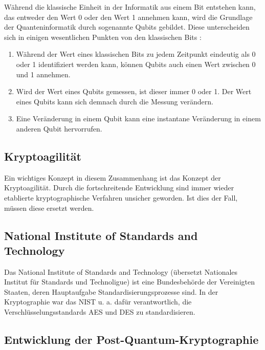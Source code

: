 		Während die klassische Einheit in der Informatik aus einem Bit entstehen kann, das entweder den Wert 0 oder den Wert 1 annehmen kann, wird die Grundlage der Quanteninformatik durch sogenannte Qubits gebildet. Diese unterscheiden sich in einigen wesentlichen Punkten von den klassischen Bits \cite{Just2020}:
		
		\begin{enumerate}
			\item Während der Wert eines klassischen Bits zu jedem Zeitpunkt eindeutig als 0 oder 1 identifiziert werden kann, können Qubits auch einen Wert zwischen 0 und 1 annehmen.
			\item Wird der Wert eines Qubits gemessen, ist dieser immer 0 oder 1. Der Wert eines Qubits kann sich demnach durch die Messung verändern.
			\item Eine Veränderung in einem Qubit kann eine instantane Veränderung in einem anderen Qubit hervorrufen.
		\end{enumerate}
	
		\subsection{Kryptoagilität}
		\label{subsec:grundlagen:pqc:agil}
		
		Ein wichtiges Konzept in diesem Zusammenhang ist das Konzept der Kryptoagilität. Durch die fortschreitende Entwicklung sind immer wieder etablierte kryptographische Verfahren unsicher geworden. Ist dies der Fall, müssen diese ersetzt werden.
	
		\subsection{National Institute of Standards and Technology}
		\label{subsec:grundlagen:pqc:nist}
		
		Das National Institute of Standards and Technology (übersetzt Nationales Institut für Standards und Technoligue) ist eine Bundesbehörde der Vereinigten Staaten, deren Hauptaufgabe Standardisierungsprozesse sind. In der Kryptographie war das NIST u. a. dafür verantwortlich, die Verschlüsselungsstandards \ac{AES} und \Ac{DES} zu standardisieren.
		
		\subsection{Entwicklung der Post-Quantum-Kryptographie}
		\label{subsec:grundlagen:pqc:entwicklung}
		
